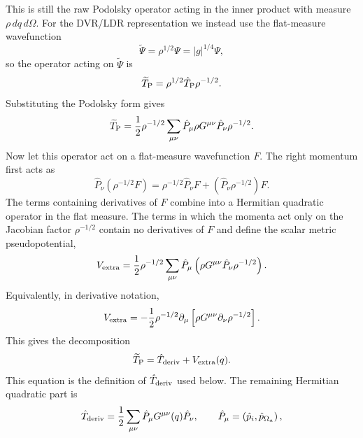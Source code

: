 \documentclass[11pt]{revtex4-2}
\begin{document}
This is still the raw Podolsky operator acting in the inner product with
measure $\rho\,dq\,d\Omega$.  For the DVR/LDR representation we instead
use the flat-measure wavefunction
\begin{equation*}
  \widetilde{\Psi}
  =
  \rho^{1/2}\Psi
  =
  |g|^{1/4}\Psi ,
\end{equation*}
so the operator acting on $\widetilde{\Psi}$ is
\begin{equation*}
  \widetilde{T}_{\rm P}
  =
  \rho^{1/2}\hat{T}_{\rm P}\rho^{-1/2}.
\end{equation*}
Substituting the Podolsky form gives
\begin{equation*}
  \widetilde{T}_{\rm P}
  =
  \frac{1}{2}
  \rho^{-1/2}
  \sum_{\mu\nu}
  \hat{P}_{\mu}
  \rho G^{\mu\nu}
  \hat{P}_{\nu}
  \rho^{-1/2}.
\end{equation*}
Now let this operator act on a flat-measure wavefunction $F$.  The right
momentum first acts as
\begin{equation*}
  \hat{P}_{\nu}
  \left(
    \rho^{-1/2}F
  \right)
  =
  \rho^{-1/2}\hat{P}_{\nu}F
  +
  \left(
    \hat{P}_{\nu}\rho^{-1/2}
  \right)F .
\end{equation*}
The terms containing derivatives of $F$ combine into a Hermitian quadratic
operator in the flat measure.  The terms in which the momenta act only on
the Jacobian factor $\rho^{-1/2}$ contain no derivatives of $F$ and define
the scalar metric pseudopotential,
\begin{equation*}
  V_{\rm extra}
  =
  \frac{1}{2}
  \rho^{-1/2}
  \sum_{\mu\nu}
  \hat{P}_{\mu}
  \left(
    \rho G^{\mu\nu}
    \hat{P}_{\nu}\rho^{-1/2}
  \right).
\end{equation*}
Equivalently, in derivative notation,
\begin{equation*}
  V_{\rm extra}
  =
  -
  \frac{1}{2}
  \rho^{-1/2}
  \partial_{\mu}
  \left[
    \rho G^{\mu\nu}
    \partial_{\nu}\rho^{-1/2}
  \right].
\end{equation*}
This gives the decomposition
\begin{equation*}
  \widetilde{T}_{\rm P}
  =
  \hat{T}_{\rm deriv}
  +
  V_{\rm extra}(q).
\end{equation*}
This equation is the definition of $\hat{T}_{\rm deriv}$ used below.  The
remaining Hermitian quadratic part is
\begin{equation*}
  \hat{T}_{\rm deriv}
  =
  \frac{1}{2}
  \sum_{\mu\nu}
  \hat{P}_{\mu}G^{\mu\nu}(q)\hat{P}_{\nu},
  \qquad
  \hat{P}_{\mu}
  =
  \left(
    \hat{p}_i,\hat{p}_{\Omega_a}
  \right),
\end{equation*}
\end{document}
